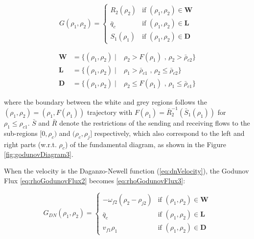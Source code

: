 \begin{equation}
G(\rho_{1},\rho_{2}) = \begin{cases}
R_{2}(\rho_{2}) & \text{if } (\rho_{1},\rho_{2}) \in \textbf{W}\\
\bar{q}_{c} & \text{if } (\rho_{1},\rho_{2}) \in \textbf{L}\\
S_{1}(\rho_{1}) & \text{if } (\rho_{1},\rho_{2}) \in \textbf{D}
\end{cases}
\label{eq:rhoGodunovFlux2}
\end{equation}

\begin{equation}
\begin{array}{lll}
\textbf{W} & = \{(\rho_{1},\rho_{2}) \mid & \rho_{2} > F(\rho_{1}) \text{ ,   } \rho_{2} > \bar{\rho}_{c2}\}\\
\textbf{L} & = \{(\rho_{1},\rho_{2}) \mid & \rho_{1} > \bar{\rho}_{c1} \text{ ,   } \rho_{2} \leq \bar{\rho}_{c2}\}\\
\textbf{D} & = \{(\rho_{1},\rho_{2}) \mid & \rho_{2} \leq F(\rho_{1}) \text{ ,   } \rho_{1} \leq \bar{\rho}_{c1}\}
\end{array}
\label{eq:regionsHetero}
\end{equation}

\noindent where the boundary between the white and grey regions follows the $(\rho_{1},\rho_{2})=(\rho_{1},F(\rho_{1}))$ trajectory with $F(\rho_{1})= \bar{R}^{-1}_{2}(\bar{S}_{1}(\rho_{1}))$ for $\rho_{1} \leq \rho_{c1}$. $\bar{S}$ and $\bar{R}$ denote the restrictions of the sending and receiving flows to the sub-regions $[0,\rho_{c})$ and $(\rho_{c},\rho_{j}]$ respectively, which also correspond to the left and right parts (w.r.t. $\rho_{c}$) of the fundamental diagram, as shown in the Figure \ref{fig:godunovDiagram3}.

\noindent When the velocity is the Daganzo-Newell function (\ref{eq:dnVelocity}), the Godunov Flux \ref{eq:rhoGodunovFlux2} becomes \ref{eq:rhoGodunovFlux3}:

\begin{equation} \label{eq:rhoGodunovFlux3a}
G_{DN}(\rho_{1},\rho_{2}) = \begin{cases}
-\omega_{f2} \left( \rho_{2} - \rho_{j2} \right) & \text{if } (\rho_{1},\rho_{2}) \in \textbf{W}\\
\bar{q}_{c} & \text{if } (\rho_{1},\rho_{2}) \in \textbf{L}\\
v_{f1} \rho_{1} & \text{if } (\rho_{1},\rho_{2}) \in \textbf{D}
\end{cases}
\end{equation}

